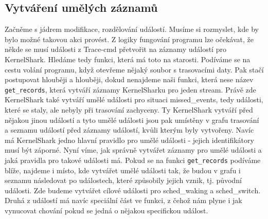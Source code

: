 \subsection{Vytváření umělých záznamů}
Začněme s jádrem modifikace, rozdělování událostí. Musíme si rozmyslet, kde by bylo možné takovou akci provést. Z logiky fungování programu lze očekávat, že někde se musí události z Trace-cmd přetvořit na záznamy událostí pro KernelShark. Hledáme tedy funkci, která má toto na starosti. Podíváme se na cestu volání programu, když otevřeme nějaký soubor s trasovacími daty. Pak stačí postupovat hlouběji a hlouběji, dokud nenajdeme naši funkci, která nese název \texttt{get\_records}, která vytváří záznamy KernelSharku pro jeden stream. Právě zde KernelShark také vytváří umělé události pro situaci missed\_events, tedy události, které se staly, ale nebyly při trasování zachyceny. Ty KernelShark vytváří před nějakou jinou událostí a tyto umělé události jsou pak umístěny v grafu trasování a seznamu událostí před záznamy událostí, kvůli kterým byly vytvořeny. Navíc má KernelShark jedno hlavní pravidlo pro umělé události - jejich identifikátory musí být záporné. Nyní víme, jak správně vytvářet záznamy pro umělé události a jaká pravidla pro takové události má. Pokud se na funkci \texttt{get\_records} podíváme blíže, najdeme i místo, kde vytvářet umělé události tak, že budou v grafu i seznamu následovat po událostech, které způsobily jejich vznik, tj. původní události. Zde budeme vytvářet cílové události pro sched\_waking a sched\_switch. Druhá z událostí má navíc speciální část ve funkci, z čehož nám plyne i jak vynucovat chování pokud se jedná o nějakou specifickou událost.

